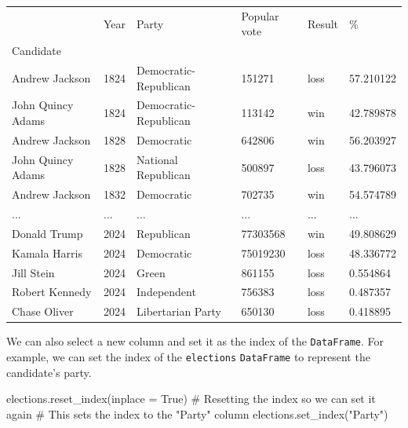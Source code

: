\documentclass[
  letterpaper,
  DIV=11,
  numbers=noendperiod]{scrreprt}
\newenvironment{Shaded}{\begin{snugshade}}{\end{snugshade}}
\newcommand{\CommentTok}[1]{\textcolor[rgb]{0.37,0.37,0.37}{#1}}
\newcommand{\NormalTok}[1]{\textcolor[rgb]{0.00,0.23,0.31}{#1}}
\newcommand{\OperatorTok}[1]{\textcolor[rgb]{0.37,0.37,0.37}{#1}}
\newcommand{\StringTok}[1]{\textcolor[rgb]{0.13,0.47,0.30}{#1}}
\newcommand{\VariableTok}[1]{\textcolor[rgb]{0.07,0.07,0.07}{#1}}
\begin{document}
\begin{longtable}[]{@{}llllll@{}}
\toprule\noalign{}
& Year & Party & Popular vote & Result & \% \\
Candidate & & & & & \\
\midrule\noalign{}
\endhead
\bottomrule\noalign{}
\endlastfoot
Andrew Jackson & 1824 & Democratic-Republican & 151271 & loss &
57.210122 \\
John Quincy Adams & 1824 & Democratic-Republican & 113142 & win &
42.789878 \\
Andrew Jackson & 1828 & Democratic & 642806 & win & 56.203927 \\
John Quincy Adams & 1828 & National Republican & 500897 & loss &
43.796073 \\
Andrew Jackson & 1832 & Democratic & 702735 & win & 54.574789 \\
... & ... & ... & ... & ... & ... \\
Donald Trump & 2024 & Republican & 77303568 & win & 49.808629 \\
Kamala Harris & 2024 & Democratic & 75019230 & loss & 48.336772 \\
Jill Stein & 2024 & Green & 861155 & loss & 0.554864 \\
Robert Kennedy & 2024 & Independent & 756383 & loss & 0.487357 \\
Chase Oliver & 2024 & Libertarian Party & 650130 & loss & 0.418895 \\
\end{longtable}

We can also select a new column and set it as the index of the
\texttt{DataFrame}. For example, we can set the index of the
\texttt{elections} \texttt{DataFrame} to represent the candidate's
party.

\begin{Shaded}
\begin{Highlighting}[]
\NormalTok{elections.reset\_index(inplace }\OperatorTok{=} \VariableTok{True}\NormalTok{) }\CommentTok{\# Resetting the index so we can set it again}
\CommentTok{\# This sets the index to the "Party" column}
\NormalTok{elections.set\_index(}\StringTok{"Party"}\NormalTok{)}
\end{Highlighting}
\end{Shaded}
\end{document}

